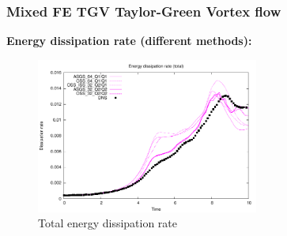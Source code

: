 \addtocounter{framenumber}{-1}
\begin{frame}
 \frametitle{Mixed FE TGV {\small Taylor-Green Vortex flow}}
 \textbf{Energy dissipation rate (different methods):}
 \vspace*{-0.3cm}
   \begin{figure}
     \centering	
     \includegraphics[width=0.65\textwidth]{Figures/oss_64_tot.pdf}
     \vspace*{-0.3cm}
     \caption{Total energy dissipation rate}
   \end{figure}
 \begin{overlayarea}{\textwidth}{1.5cm}
  \end{overlayarea}
\end{frame}
\addtocounter{framenumber}{-1}
